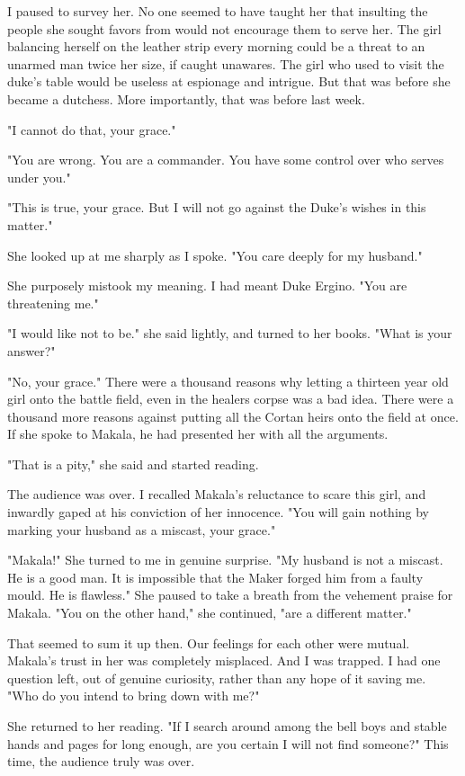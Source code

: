 \documentclass{article}
\begin{document}
I paused to survey her. No one seemed to have taught her that insulting the people she sought favors from would not encourage them to serve her. The girl balancing herself on the leather strip every morning could be a threat to an unarmed man twice her size, if caught unawares. The girl who used to visit the duke's table would be useless at espionage and intrigue. But that was before she became a dutchess. More importantly, that was before last week.

"I cannot do that, your grace."

"You are wrong. You are a commander. You have some control over who serves under you."

"This is true, your grace. But I will not go against the Duke's wishes in this matter."

She looked up at me sharply as I spoke. "You care deeply for my husband."

She purposely mistook my meaning. I had meant Duke Ergino. "You are threatening me." 

"I would like not to be." she said lightly, and turned to her books. "What is your answer?"

"No, your grace." There were a thousand reasons why letting a thirteen year old girl onto the battle field, even in the healers corpse was a bad idea. There were a thousand more reasons against putting all the Cortan heirs onto the field at once. If she spoke to Makala, he had presented her with all the arguments. 

"That is a pity," she said and started reading.

The audience was over. I recalled Makala's reluctance to scare this girl, and inwardly gaped at his conviction of her innocence. "You will gain nothing by marking your husband as a miscast, your grace."

"Makala!" She turned to me in genuine surprise. "My husband is not a miscast. He is a good man. It is impossible that the Maker forged him from a faulty mould. He is flawless." She paused to take a breath from the vehement praise for Makala. "You on the other hand," she continued, "are a different matter."

That seemed to sum it up then. Our feelings for each other were mutual. Makala's trust in her was completely misplaced. And I was trapped. I had one question left, out of genuine curiosity, rather than any hope of it saving me. "Who do you intend to bring down with me?"

She returned to her reading. "If I search around among the bell boys and stable hands and pages for long enough, are you certain I will not find someone?" This time, the audience truly was over. 
\end{document}
